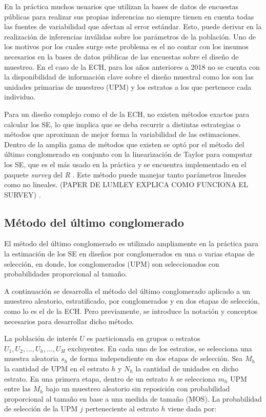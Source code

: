 \documentclass[12pt,twoside,spanish,a4paper]{book}\usepackage[]{graphicx}\usepackage[]{color}
\begin{document}
En la práctica muchos usuarios que utilizan la bases de datos de encuestas públicas para realizar sus propias inferencias no siempre tienen en cuenta todas las fuentes de variabilidad que afectan al error estándar. Esto, puede derivar en la realización de inferencias inválidas sobre los parámetros de la población. Uno de los motivos por los cuales surge este problema es el no contar con los insumos necesarios en la bases de datos públicas de las encuestas sobre el diseño de muestreo. En el caso de la ECH, para los años anteriores a 2018 no se cuenta con la disponibilidad de información clave sobre el diseño muestral como los son las unidades primarias de muestreo (UPM) y los estratos a los que pertenece cada individuo.

Para un diseño complejo como el de la ECH, no existen métodos exactos para calcular los SE, lo que implica que se deba recurrir a distintas estrategias o métodos que aproximan de mejor forma la variabilidad de las estimaciones. Dentro de la amplia gama de métodos que existen se optó por el método del último conglomerado en conjunto con la linearización de Taylor para computar los SE, que es el más usado en la práctica y se encuentra implementado en el paquete \textit{survey} \citep{survey} del \textit{R} \citep{r}. Este método puede manejar tanto parámetros lineales como no lineales. (PAPER DE LUMLEY EXPLICA COMO FUNCIONA EL SURVEY) \citep{surveyLumley}.

\subsection{Método del último conglomerado \label{subsec:ultcong}}

El método del último conglomerado es utilizado ampliamente en la práctica para la estimación de los SE en diseños por conglomerados en una o varias etapas de selección, en donde, los conglomerados (UPM) son seleccionados con probabilidades proporcional al tamaño. 

A continuación se desarrolla el método del último conglomerado aplicado a un muestreo aleatorio, estratificado, por conglomerados y en dos etapas de selección, como lo es el de la ECH. Pero previamente, se introduce la notación y conceptos necesarios para desarrollar dicho método.

La población de interés $U$ es particionada en grupos o estratos $U_1, U_2,...,U_h,...,U_H$ excluyentes. En cada uno de los estratos, se selecciona una muestra aleatoria $s_h$ de forma independiente en dos etapas de selección. Sea $M_h$ la cantidad de UPM en el estrato $h$ y $N_h$ la cantidad de unidades en dicho estrato. En una primera etapa, dentro de un estrato $h$ se selecciona $m_h$ UPM entre las $M_h$ bajo un muestreo aleatorio sin reposición con probabilidad proporcional al tamaño en base a una medida de tamaño (MOS). La probabilidad de selección de la UPM $j$ perteneciente al estrato $h$ viene dada por:
\end{document}
